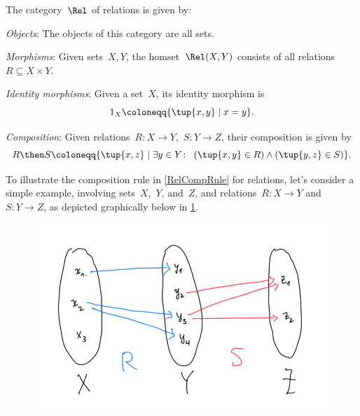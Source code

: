 \begin{definition} 
    The category~$\Rel$ of relations is given by:
    \begin{compactenum}
    \item \emph{Objects}: The objects of this category are all sets.
    \item \emph{Morphisms}: Given sets~$X, Y$, the homset~$\Rel(X,Y)$ consists of all
    relations~$R\subseteq X\times Y$.
    \item \emph{Identity morphisms}: Given a set~$X$, its identity morphism is
  	\begin{equation}
	1_X \coloneqq \{ \tup{x,y} \mid  x = y \}.
	\end{equation}
    \item \emph{Composition}: Given relations~$R \colon X\to Y$,~$S\colon Y\to Z$, their composition is given by
    \begin{equation}\label{RelCompRule}
    R \then S \coloneqq \{\tup{x,z} \mid  \exists y \in Y \colon \ \left(\tup{x,y} \in R\right) \wedge \left(\tup{y,z} \in S\right)\}.
    \end{equation}
\end{compactenum}
\end{definition}


To illustrate the composition rule in \cref{RelCompRule} for relations, let's consider a simple example, involving sets~$X$,~$Y$, and~$Z$, and relations~$R \colon X \to Y$ and $S \colon Y \to Z$, as depicted graphically below in \cref{fig:example_rel_composable}. 
\begin{figure}[h!]
\centering
 \includegraphics[width=0.5\linewidth]{pics/dist_net_9.png}
 \caption{}
\label{fig:example_rel_composable}
\end{figure}

\begin{center}
\end{center}

